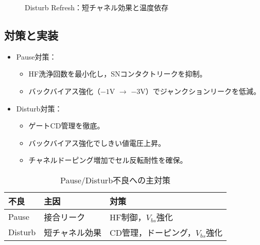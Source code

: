 \documentclass[conference]{IEEEtran}
\begin{document}
\begin{figure}[t]
\centering
{}
\caption{Disturb Refresh：短チャネル効果と温度依存}
\label{fig:disturb}
\end{figure}

\subsection{対策と実装}
\begin{itemize}
  \item Pause対策：
    \begin{itemize}
      \item HF洗浄回数を最小化し，SNコンタクトリークを抑制。
      \item バックバイアス強化（$-1$V $\rightarrow$ $-3$V）でジャンクションリークを低減。
    \end{itemize}
  \item Disturb対策：
    \begin{itemize}
      \item ゲートCD管理を徹底。
      \item バックバイアス強化でしきい値電圧上昇。
      \item チャネルドーピング増加でセル反転耐性を確保。
    \end{itemize}
\end{itemize}

\begin{table}[t]
\centering
\caption{Pause/Disturb不良への主対策}
\begin{tabular}{lll}
\toprule
不良 & 主因 & 対策 \\
\midrule
Pause & 接合リーク & HF制御，$V_{bs}$強化 \\
Disturb & 短チャネル効果 & CD管理，ドーピング，$V_{bs}$強化 \\
\bottomrule
\end{tabular}
\end{table}
\end{document}
